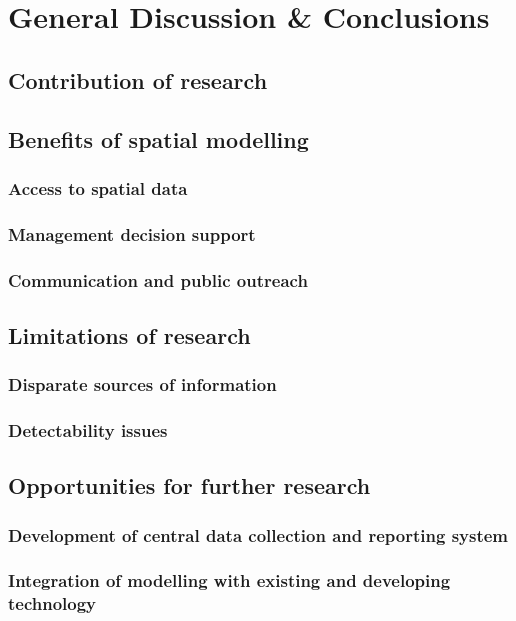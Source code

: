 \chapter{General Discussion \& Conclusions}\label{sec:conc}
\newpage

\section{Contribution of research}

\section{Benefits of spatial modelling}

\subsection{Access to spatial data}

\subsection{Management decision support}

\subsection{Communication and public outreach}

\section{Limitations of research}

\subsection{Disparate sources of information}

\subsection{Detectability issues}

\section{Opportunities for further research}

\subsection{Development of central data collection and reporting system}

\subsection{Integration of modelling with existing and developing technology}